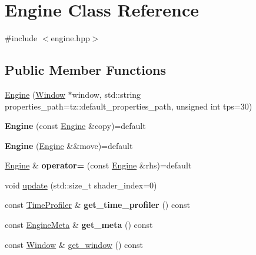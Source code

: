 \hypertarget{class_engine}{}\section{Engine Class Reference}
\label{class_engine}


{\ttfamily \#include $<$engine.\+hpp$>$}

\subsection*{Public Member Functions}
\begin{DoxyCompactItemize}
\item 
\mbox{\hyperlink{class_engine_a1e76f3786243e116f071e98724fe4a25}{Engine}} (\mbox{\hyperlink{class_window}{Window}} $\ast$window, std\+::string properties\+\_\+path=tz\+::default\+\_\+properties\+\_\+path, unsigned int tps=30)
\item 
\mbox{\label{class_engine_ae115127e3dcb6916f44b070cd94eec86}} 
{\bfseries Engine} (const \mbox{\hyperlink{class_engine}{Engine}} \&copy)=default
\item 
\mbox{\label{class_engine_a21831fd3d22bba5db978ed8f6a5a13e1}} 
{\bfseries Engine} (\mbox{\hyperlink{class_engine}{Engine}} \&\&move)=default
\item 
\mbox{\label{class_engine_ab1e81e6840409144537a1ba54d1ad5eb}} 
\mbox{\hyperlink{class_engine}{Engine}} \& {\bfseries operator=} (const \mbox{\hyperlink{class_engine}{Engine}} \&rhs)=default
\item 
void \mbox{\hyperlink{class_engine_a12375001d456a8beb1b51c5f97ad6c22}{update}} (std\+::size\+\_\+t shader\+\_\+index=0)
\item 
\mbox{\label{class_engine_abaf7e650f53c4d2564de41a9057436c8}} 
const \mbox{\hyperlink{class_time_profiler}{Time\+Profiler}} \& {\bfseries get\+\_\+time\+\_\+profiler} () const
\item 
\mbox{\label{class_engine_a54d43658e5b3e49cb0a1f9a1fda4c992}} 
const \mbox{\hyperlink{class_engine_meta}{Engine\+Meta}} \& {\bfseries get\+\_\+meta} () const
\item 
const \mbox{\hyperlink{class_window}{Window}} \& \mbox{\hyperlink{class_engine_a30c10f14f67c8f6b0b6d0f47393ea31c}{get\+\_\+window}} () const

\end{DoxyCompactItemize}
